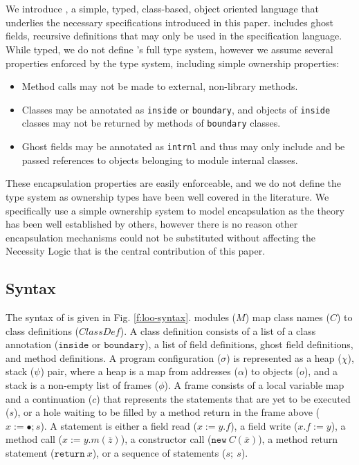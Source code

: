 
\section{\Loo}
\label{app:loo}


We introduce \Loo, a simple, typed, class-based, object oriented language that underlies the necessary specifications
introduced in this paper. \Loo includes ghost fields, recursive definitions that may only be
used in the specification language.
While typed, we do not define \Loo's
full type system, however we assume several properties enforced by the type system, including 
simple ownership properties:
\begin{itemize}
\item
Method calls may not be made to external, non-library methods.
\item
Classes may be annotated as \texttt{inside} or \texttt{boundary}, and objects of \texttt{inside} classes may not be returned by methods of \texttt{boundary} classes.
\item
Ghost fields may be annotated as \texttt{intrnl} and thus may only include and be passed references to objects belonging to module internal classes.
\end{itemize}
These encapsulation properties are easily enforceable, and we
do not define the type system as ownership types have been 
well covered in the literature. 
We specifically use a simple ownership system to model 
encapsulation as the theory has been well established by others, 
however there is no reason other encapsulation mechanisms could 
not be substituted without affecting the Necessity Logic that 
is the central contribution of this paper.

\subsection{Syntax}
The syntax of \Loo is given in Fig. \ref{f:loo-syntax}.
\Loo modules ($M$) map class names ($C$) to class definitions ($\textit{ClassDef}$).
A class definition consists of a list of a class annotation ($\texttt{inside}$ or $\texttt{boundary}$),
a list of field definitions, ghost field definitions, and method definitions.
A program configuration ($\sigma$) is represented as a heap ($\chi$), stack ($\psi$) pair, 
where a heap is a map from addresses ($\alpha$) to objects ($o$), and a stack is a non-empty list of frames ($\phi$). A frame consists of a local variable
map and a continuation ($c$) that represents the statements that are yet to be executed ($s$),
or a hole waiting to be filled by a method return in the frame above ($x := \bullet; s$).
A statement is either a field read ($x := y.f$), a field write ($x.f := y$), a method call
($x := y.m(\overline{z})$), a constructor call ($\texttt{new}\ C(\overline{x})$), a method return statement
($\texttt{return}\ x$), or a sequence of statements ($s;\ s$).

